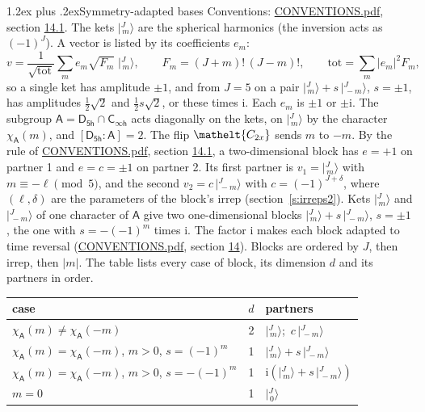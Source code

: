 \documentclass[10pt,a4paper]{article}
\makeatletter
\renewcommand\section{\@startsection{section}{1}{\z@}{-3ex plus -1ex minus -.2ex}%
  {1.2ex plus .2ex}{\normalfont\large\sffamily\bfseries\color{parttitle}}}
\numberwithin{equation}{section}
\newcommand{\eltfont}[1]{{\let\sigma\eltsigma\mathelt{#1}}}
\newcommand{\grp}[1]{\mathsf{#1}}
\newcommand{\elt}[1]{\eltfont{#1}}
\newcommand{\grpindex}[2]{[#1 : #2]}
\newcommand{\iunit}{\mathrm{i}}
\newcommand{\chiA}{\chi_{\grp{A}}}
\newcommand{\jm}[2]{\bigl\lvert{}^{#1}_{\,#2}\bigr\rangle}
\makeatother
\begin{document}
\section{Symmetry-adapted bases}\label{s:bases}
Conventions: \href{../../CONVENTIONS.pdf}{CONVENTIONS.pdf}, section \href{../../CONVENTIONS.pdf\#conv.14.1}{14.1}.
\leavevmode\label{n:index.m}\label{n:vector.ket}The kets $\jm{J}{m}$ are the spherical harmonics (the inversion acts as $(-1)^J$). \label{n:index.ketcoefficient}\label{n:vector.basis.symmetry}\label{n:index.ketweight}\label{n:index.total}A vector is listed by its coefficients $e_m$:
\begin{equation}\label{e:ket}v = \frac{1}{\sqrt{\mathrm{tot}}}\sum_m e_m\sqrt{F_m}\;\jm{J}{m},\qquad F_m = (J+m)!\,(J-m)!,\qquad \mathrm{tot} = \sum_m |e_m|^2F_m,\end{equation}
\leavevmode\label{n:index.pair.sign}so a single ket has amplitude $\pm1$, and from $J = 5$ on a pair $\jm{J}{m} + s\,\jm{J}{-m}$, $s = \pm1$, has amplitudes $\tfrac{1}{2}\sqrt{2}$ and $\tfrac{1}{2}s\sqrt{2}$, or these times $\iunit$. Each $e_m$ is $\pm1$ or $\pm\iunit$.
\leavevmode\label{n:group.A}\label{n:function.character.abelian}The subgroup $\grp{A} = \grp{D_{5h}}\cap\grp{C_{\infty h}}$ acts diagonally on the kets, on $\jm{J}{m}$ by the character $\chiA(m)$, and $\grpindex{\grp{D_{5h}}}{\grp{A}} = 2$. The flip $\elt{C_{2x}}$ sends $m$ to $-m$. \label{n:index.partner.sign}By the rule of \href{../../CONVENTIONS.pdf}{CONVENTIONS.pdf}, section \href{../../CONVENTIONS.pdf\#conv.14.1}{14.1}, a two-dimensional block has $e = +1$ on partner 1 and $e = c = \pm1$ on partner 2. Its first partner is $v_1 = \jm{J}{m}$ with $m \equiv -\ell \pmod{5}$, and the second $v_2 = c\,\jm{J}{-m}$ with $c = (-1)^{J+\delta}$, where $(\ell, \delta)$ are the parameters of the block's irrep (section~\ref{s:irreps2}). Kets $\jm{J}{m}$ and $\jm{J}{-m}$ of one character of $\grp{A}$ give two one-dimensional blocks $\jm{J}{m} + s\,\jm{J}{-m}$, $s = \pm1$, the one with $s = -(-1)^m$ times $\iunit$. The factor $\iunit$ makes each block adapted to time reversal (\href{../../CONVENTIONS.pdf}{CONVENTIONS.pdf}, section \href{../../CONVENTIONS.pdf\#conv.14}{14}). Blocks are ordered by $J$, then irrep, then $|m|$.
\leavevmode\label{n:head.case}\label{n:head.partners}The table lists every case of block, its dimension $d$ and its partners in order.
\begin{center}\begin{tabular}{@{}lrl@{}}\toprule
case & $d$ & partners\\\midrule
$\chiA(m) \ne \chiA(-m)$ & 2 & $\jm{J}{m}$;\ $c\,\jm{J}{-m}$\\
$\chiA(m) = \chiA(-m)$, $m > 0$, $s = (-1)^m$ & 1 & $\jm{J}{m} + s\,\jm{J}{-m}$\\
$\chiA(m) = \chiA(-m)$, $m > 0$, $s = -(-1)^m$ & 1 & $\iunit(\jm{J}{m} + s\,\jm{J}{-m})$\\
$m = 0$ & 1 & $\jm{J}{0}$\\
\bottomrule\end{tabular}\end{center}
\end{document}
